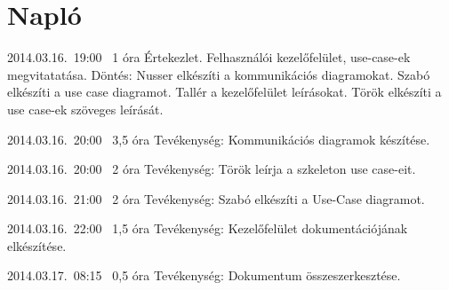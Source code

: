 %
\pagebreak
\section{Napló}

\begin{naplo}

\bejegyzes
{2014.03.16.~19:00~}
{1 óra}
{\vadam\newline
\vantal\newline
\vbator\newline
\vtorok}
{Értekezlet.  Felhasználói kezelőfelület, use-case-ek megvitatatása. 
\newline Döntés: Nusser elkészíti a kommunikációs diagramokat.
\newline Szabó elkészíti a use case diagramot.
\newline Tallér a kezelőfelület leírásokat.
\newline Török elkészíti a use case-ek szöveges leírását.}

\bejegyzes
{2014.03.16.~20:00~}
{3,5 óra}
{\vadam}
{Tevékenység: Kommunikációs diagramok készítése.}

\bejegyzes
{2014.03.16.~20:00~}
{2 óra}
{\vtorok}
{Tevékenység: Török leírja a szkeleton use case-eit.}

\bejegyzes
{2014.03.16.~21:00~}
{2 óra}
{\vantal}
{Tevékenység: Szabó elkészíti a Use-Case diagramot.}

\bejegyzes
{2014.03.16.~22:00~}
{1,5 óra}
{\vbator}
{Tevékenység: Kezelőfelület dokumentációjának elkészítése.}

\bejegyzes
{2014.03.17.~08:15~}
{0,5 óra}
{\vbator}
{Tevékenység: Dokumentum összeszerkesztése.}
\end{naplo}
